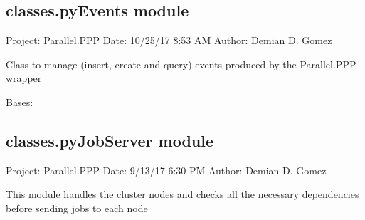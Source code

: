 \documentclass[letterpaper,10pt,english]{sphinxmanual}
\begin{document}
\subsection{classes.pyEvents module}
\label{\detokenize{classes:module-classes.pyEvents}}\label{\detokenize{classes:classes-pyevents-module}}
\sphinxAtStartPar
Project: Parallel.PPP
Date: 10/25/17 8:53 AM
Author: Demian D. Gomez

\sphinxAtStartPar
Class to manage (insert, create and query) events produced by the Parallel.PPP wrapper

\begin{fulllineitems}
\label{\detokenize{classes:classes.pyEvents.Event}}
\pysigstartsignatures
{}
\pysigstopsignatures
\sphinxAtStartPar
Bases: 

\begin{fulllineitems}
\label{\detokenize{classes:classes.pyEvents.Event.db_dict}}
\pysigstartsignatures
{}
\pysigstopsignatures
\end{fulllineitems}


\end{fulllineitems}



\subsection{classes.pyJobServer module}
\label{\detokenize{classes:module-classes.pyJobServer}}\label{\detokenize{classes:classes-pyjobserver-module}}
\sphinxAtStartPar
Project: Parallel.PPP
Date: 9/13/17 6:30 PM
Author: Demian D. Gomez

\sphinxAtStartPar
This module handles the cluster nodes and checks all the necessary dependencies
before sending jobs to each node
\end{document}
